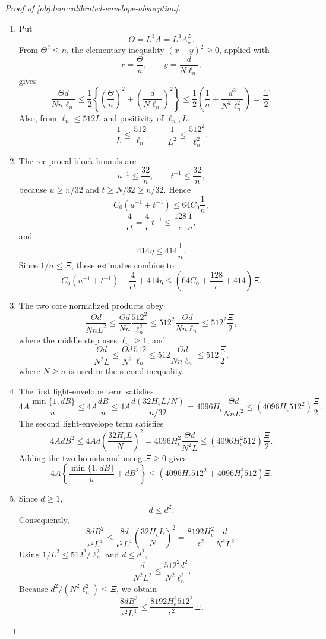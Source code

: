 \begin{proof}[Proof of \cref{obj:lem:calibrated-envelope-absorption}]
\begin{enumerate}
\item Put
\[
\Theta=L^3A=L^3A_\star^L.
\]
From \(\Theta^2\le n\), the elementary inequality \((x-y)^2\ge0\), applied with
\[
x=\frac{\Theta}{n},
\qquad
y=\frac{d}{N\ell_n},
\]
gives
\[
\frac{\Theta d}{Nn\ell_n}
\le
\frac12\left\{\left(\frac{\Theta}{n}\right)^2
+\left(\frac{d}{N\ell_n}\right)^2\right\}
\le
\frac12\left(\frac1n+\frac{d^2}{N^2\ell_n^2}\right)
=
\frac{\Xi}{2}.
\]
Also, from \(\ell_n\le512L\) and positivity of \(\ell_n,L\),
\[
\frac1L\le\frac{512}{\ell_n},
\qquad
\frac1{L^2}\le\frac{512^2}{\ell_n^2}.
\]

\item The reciprocal block bounds are
\[
u^{-1}\le\frac{32}{n},
\qquad
t^{-1}\le\frac{32}{n},
\]
because \(u\ge n/32\) and \(t\ge N/32\ge n/32\). Hence
\[
C_0(u^{-1}+t^{-1})
\le
64C_0\frac1n,
\]
\[
\frac4{\epsilon t}
=
\frac4\epsilon\,t^{-1}
\le
\frac{128}{\epsilon}\frac1n,
\]
and
\[
414\eta\le414\frac1n.
\]
Since \(1/n\le\Xi\), these estimates combine to
\[
C_0(u^{-1}+t^{-1})+\frac4{\epsilon t}+414\eta
\le
\left(64C_0+\frac{128}{\epsilon}+414\right)\Xi .
\]

\item The two core normalized products obey
\[
\frac{\Theta d}{NnL^2}
\le
\frac{\Theta d}{Nn}\frac{512^2}{\ell_n^2}
\le
512^2\frac{\Theta d}{Nn\ell_n}
\le
512^2\frac{\Xi}{2},
\]
where the middle step uses \(\ell_n\ge1\), and
\[
\frac{\Theta d}{N^2L}
\le
\frac{\Theta d}{N^2}\frac{512}{\ell_n}
\le
512\frac{\Theta d}{Nn\ell_n}
\le
512\frac{\Xi}{2},
\]
where \(N\ge n\) is used in the second inequality. %

\item The first light-envelope term satisfies
\[
4A\frac{\min\{1,dB\}}{u}
\le
4A\frac{dB}{u}
\le
4A\frac{d(32H_\epsilon L/N)}{n/32}
=
4096H_\epsilon\frac{\Theta d}{NnL^2}
\le
(4096H_\epsilon512^2)\frac{\Xi}{2}.
\]
The second light-envelope term satisfies
\[
4AdB^2
\le
4Ad\left(\frac{32H_\epsilon L}{N}\right)^2
=
4096H_\epsilon^2\frac{\Theta d}{N^2L}
\le
(4096H_\epsilon^2 512)\frac{\Xi}{2}.
\]
Adding the two bounds and using \(\Xi\ge0\) gives
\[
4A\left\{\frac{\min\{1,dB\}}u+dB^2\right\}
\le
(4096H_\epsilon512^2+4096H_\epsilon^2 512)\Xi .
\]

\item Since \(d\ge1\),
\[
d\le d^2.
\]
Consequently,
\[
\frac{8dB^2}{\epsilon^2L^4}
\le
\frac{8d}{\epsilon^2L^4}
\left(\frac{32H_\epsilon L}{N}\right)^2
=
\frac{8192H_\epsilon^2}{\epsilon^2}
\frac{d}{N^2L^2}.
\]
Using \(1/L^2\le512^2/\ell_n^2\) and \(d\le d^2\),
\[
\frac{d}{N^2L^2}
\le
\frac{512^2d^2}{N^2\ell_n^2}.
\]
Because \(d^2/(N^2\ell_n^2)\le\Xi\), we obtain
\[
\frac{8dB^2}{\epsilon^2L^4}
\le
\frac{8192H_\epsilon^2 512^2}{\epsilon^2}\,\Xi .
\]


\end{enumerate}
\end{proof}
